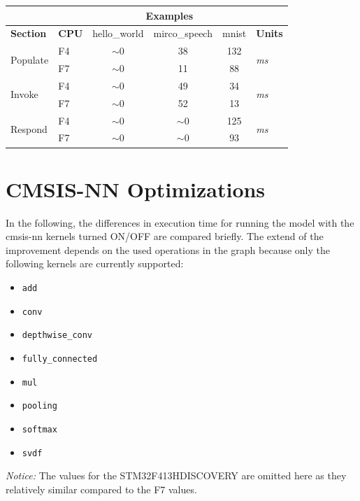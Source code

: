 \documentclass[oneside]{tum-book}
\begin{document}
\begin{table}[h!]
\begin{tabular}{|l|l|c|c|c|l|}
\hline
& &\multicolumn{3}{c|}{\textbf{Examples}} &\\\hline
\textbf{Section} & \textbf{CPU} & hello\_world  & mirco\_speech & mnist                                         & \textbf{Units} \\\hline
\multirow{2}{*}{Populate}     &  F4              & $\sim$0 & 38 & 132 & \multirow{2}{*}{\textit{ms}} \\
&F7&$\sim$0&11&88&\\\hline
\multirow{2}{*}{Invoke}     &  F4              & $\sim$0 & 49 & 34 & \multirow{2}{*}{\textit{ms}} \\
&F7&$\sim$0&52&13&\\\hline
\multirow{2}{*}{Respond}     &  F4              & $\sim$0 & $\sim$0 & 125 & \multirow{2}{*}{\textit{ms}} \\
&F7&$\sim$0&$\sim$0&93&\\\hline
\end{tabular}
\end{table}

\section{CMSIS-NN Optimizations}

In the following, the differences in execution time for running the model with the cmsis-nn kernels turned ON/OFF are compared briefly. The extend of the improvement depends on the used operations in the graph because only the following kernels are currently supported:

\begin{multicols}{2}
\begin{itemize}
    \item \lstinline{add}
    \item \lstinline{conv}
    \item \lstinline{depthwise_conv}
    \item \lstinline{fully_connected}
    \item \lstinline{mul}
    \item \lstinline{pooling}
    \item \lstinline{softmax}
    \item \lstinline{svdf}
\end{itemize}
\end{multicols}

\textit{Notice:} The values for the STM32F413HDISCOVERY are omitted here as they relatively similar compared to the F7 values.
\end{document}
